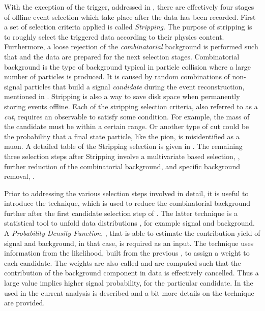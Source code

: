 
With the exception of the trigger, addressed in , there are effectively four stages of offline event
selection which take place after the data has been recorded.
First a set of selection criteria applied is called {\it Stripping}. The purpose of stripping is to roughly
select the triggered data according to their physics content. Furthermore, a loose rejection of the {\it combinatorial}
background is performed such that and the data are prepared for the next selection stages.
Combinatorial background is the type of background typical in particle collision where a large number of
particles is produced. It is caused by random combinations of non-signal particles that build a signal
{\it candidate} during the event reconstruction, mentioned in .
Stripping is also a way to save disk space when permanently storing events offline. 
Each of the stripping selection criteria, also referred to as a {\it cut},
requires an observable to satisfy some condition. For example, the mass of the \Bs candidate must be within
a certain range. Or another type of cut could be the probability that a final state particle, like the pion, is misidentified
as a muon. A detailed table of the Stripping selection is given in . 
The remaining three selection steps after Stripping involve a multivariate based selection, , 
further reduction of the combinatorial background,  and specific background removal, 
.

Prior to addressing the various selection steps involved in detail, it is useful to introduce the 
\sPlot technique, which is used to reduce the combinatorial background further after the first 
candidate selection step of . The latter technique is a statistical 
tool to unfold data distributions \cite{splot}, for example signal and background. A {\it Probability Density Function}, 
\pdf, that is able to estimate the contribution-yield of signal and background, in that case, is required as an input. 
The \sPlot technique uses information from the likelihood, built from the previous \pdf, to assign a 
weight to each candidate. The weights are also called {\sWeights} and are computed such that the contribution
of the background component in data is effectively cancelled. Thus a large \sWeight value implies 
higher signal probability, for the particular candidate. In  the \pdf 
used in the current analysis is described and a bit more details on the \sPlot technique are provided.


